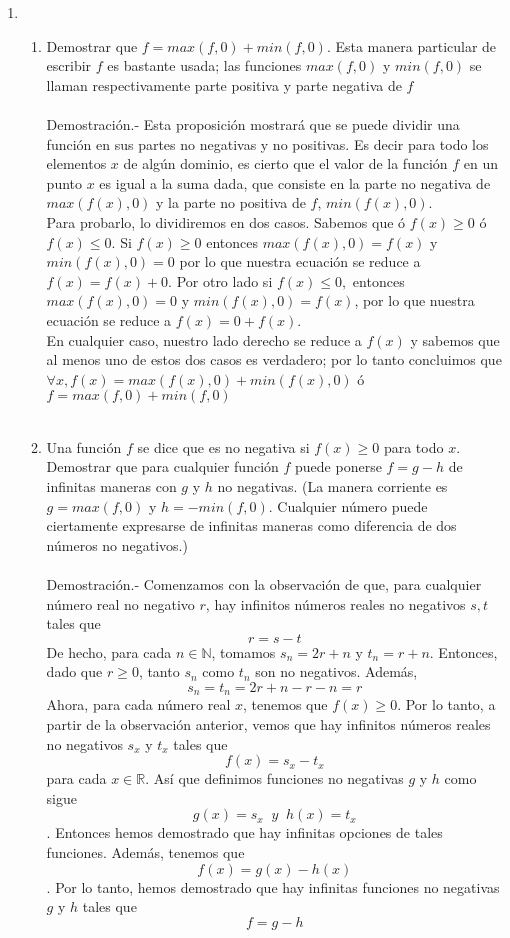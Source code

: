 \begin{enumerate}
	\item 

	\begin{enumerate}[\bfseries (a)]
	    
	    \item Demostrar que $f=max(f,0)+min(f,0)$. Esta manera particular de escribir $f$ es bastante usada; las funciones $max(f,0)$ y $min(f,0)$ se llaman respectivamente parte positiva y parte negativa de $f$\\\\
	    Demostración.-\; Esta proposición mostrará que se puede dividir una función en sus partes no negativas y no positivas. Es decir para todo los elementos $x$ de algún dominio, es cierto que el valor de la función $f$ en un punto $x$ es igual a la suma dada, que consiste en la parte no negativa de $max(f(x),0)$ y la parte no positiva de $f$, $min(f(x),0)$.\\
	    Para probarlo, lo dividiremos en dos casos. Sabemos que ó $f(x)\geq 0$ ó $f(x)\leq 0$. Si $f(x)\geq 0$ entonces $max(f(x),0)=f(x)$ y $min(f(x),0)=0$ por lo que nuestra ecuación se reduce a $f(x)=f(x)+0$. Por otro lado si $f(x)\leq 0,$ entonces $max(f(x),0)=0$ y $min(f(x),0)=f(x)$, por lo que nuestra ecuación se reduce a $f(x)=0+f(x)$.\\
	    En cualquier caso, nuestro lado derecho se reduce a $f(x)$ y sabemos que al menos uno de estos dos casos es verdadero; por lo tanto concluimos que $\forall x, f(x)= max(f(x),0)+min(f(x),0)$ ó $f=max (f,0)+min(f,0)$\\\\

	    \item Una función $f$ se dice que es no negativa si $f(x)\geq 0$ para todo $x$. Demostrar que para cualquier función $f$ puede ponerse $f=g-h$ de infinitas maneras con $g$ y $h$ no negativas. (La manera corriente es $g=max(f,0)$ y $h=-min(f,0)$. Cualquier número puede ciertamente expresarse de infinitas maneras como diferencia de dos números no negativos.)\\\\
	    Demostración.-\; Comenzamos con la observación de que, para cualquier número real no negativo $r$, hay infinitos números reales no negativos $s, t$ tales que $$r=s-t$$ De hecho, para cada $n \in \mathbb{N}$, tomamos $s_n = 2r + n$ y $t_n = r + n$. Entonces, dado que $r\geq 0$, tanto $s_n$ como $t_n$ son no negativos. Además, $$s_n=t_n=2r+n-r-n=r$$ Ahora, para cada número real $x$, tenemos que $f(x)\geq  0$. Por lo tanto, a partir de la observación anterior, vemos que hay infinitos números reales no negativos $s_x$ y $t_x$ tales que $$f(x)=s_x-t_x$$ para cada $x \in \mathbb{R}$. Así que definimos funciones no negativas $g$ y $h$ como sigue $$g(x)=s_x\;\; y \;\; h(x)=t_x$$. Entonces hemos demostrado que hay infinitas opciones de tales funciones. Además, tenemos que $$f(x)=g(x)-h(x)$$. Por lo tanto, hemos demostrado que hay infinitas funciones no negativas $g$ y $h$ tales que $$f = g-h$$\\\\


\end{enumerate}
\end{enumerate}
